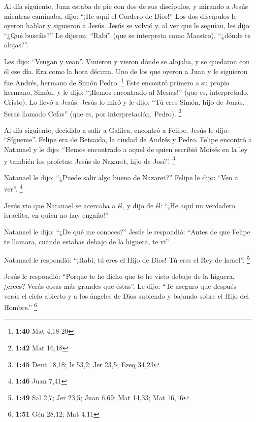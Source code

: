  Al día siguiente, Juan estaba de pie con dos de sus
discípulos,  y mirando a Jesús mientras caminaba, dijo:
``¡He aquí el Cordero de Dios!''  Los dos discípulos le
oyeron hablar y siguieron a Jesús.  Jesús se volvió y, al
ver que le seguían, les dijo: ``¿Qué buscáis?'' Le dijeron: ``Rabí''
(que se interpreta como Maestro), ``¿dónde te alojas?''.

 Les dijo: ``Vengan y vean''. Vinieron y vieron dónde se
alojaba, y se quedaron con él ese día. Era como la hora décima.
 Uno de los que oyeron a Juan y le siguieron fue Andrés,
hermano de Simón Pedro. \footnote{\textbf{1:40} Mat 4,18-20}
 Este encontró primero a su propio hermano, Simón, y le
dijo: ``¡Hemos encontrado al Mesías!'' (que es, interpretado, Cristo).
 Lo llevó a Jesús. Jesús lo miró y le dijo: ``Tú eres
Simón, hijo de Jonás. Seras llamado Cefas'' (que es, por interpretación,
Pedro). \footnote{\textbf{1:42} Mat 16,18}

 Al día siguiente, decidido a salir a Galilea, encontró a
Felipe. Jesús le dijo: ``Sígueme''.  Felipe era de
Betsaida, la ciudad de Andrés y Pedro.  Felipe encontró a
Natanael y le dijo: ``Hemos encontrado a aquel de quien escribió Moisés
en la ley y también los profetas: Jesús de Nazaret, hijo de José''.
\footnote{\textbf{1:45} Deut 18,18; Is 53,2; Jer 23,5; Ezeq 34,23}

 Natanael le dijo: ``¿Puede salir algo bueno de
Nazaret?'' Felipe le dijo: ``Ven a ver''. \footnote{\textbf{1:46} Juan
  7,41}

 Jesús vio que Natanael se acercaba a él, y dijo de él:
``¡He aquí un verdadero israelita, en quien no hay engaño!''

 Natanael le dijo: ``¿De qué me conoces?'' Jesús le
respondió: ``Antes de que Felipe te llamara, cuando estabas debajo de la
higuera, te vi''.

 Natanael le respondió: ``¡Rabí, tú eres el Hijo de Dios!
Tú eres el Rey de Israel''. \footnote{\textbf{1:49} Sal 2,7; Jer 23,5;
  Juan 6,69; Mat 14,33; Mat 16,16}

 Jesús le respondió: ``Porque te he dicho que te he visto
debajo de la higuera, ¿crees? Verás cosas más grandes que éstas''.
 Le dijo: ``Te aseguro que después verás el cielo abierto
y a los ángeles de Dios subiendo y bajando sobre el Hijo del Hombre.''
\footnote{\textbf{1:51} Gén 28,12; Mat 4,11}

